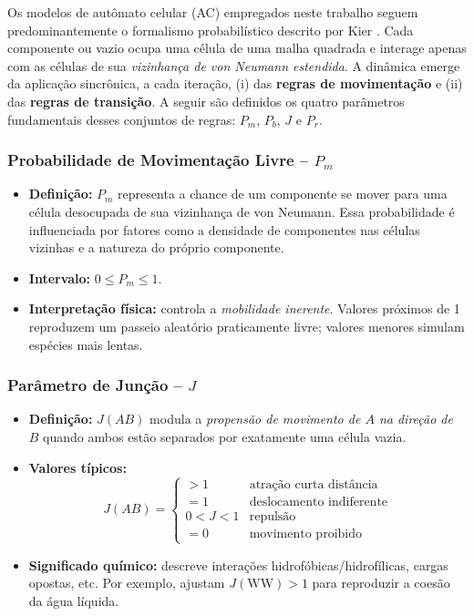\documentclass[12pt,oneside]{report}
\begin{document}
Os modelos de autômato celular (AC) empregados neste trabalho seguem predominantemente o formalismo probabilístico descrito por Kier \cite{kier2005}. Cada componente ou vazio ocupa uma célula de uma malha quadrada e interage apenas com as células de sua \textit{vizinhança de von Neumann estendida}. A dinâmica emerge da aplicação sincrônica, a cada iteração, (i) das \textbf{regras de movimentação} e (ii) das \textbf{regras de transição}. A seguir são definidos os quatro parâmetros fundamentais desses conjuntos de regras: $P_m$, $P_b$, $J$ e $P_r$.

\subsubsection{Probabilidade de Movimentação Livre – \texorpdfstring{$P_m$}{Pm}}
\label{sec:probabilidade_movimento_livre}

\begin{itemize}
    \item \textbf{Definição:} $P_m$ representa a chance de um componente se mover para uma célula desocupada de sua vizinhança de von Neumann. Essa probabilidade é influenciada por fatores como a densidade de componentes nas células vizinhas e a natureza do próprio componente.
    \item \textbf{Intervalo:} $0 \le P_m \le 1$.
    \item \textbf{Interpretação física:} controla a \textit{mobilidade inerente}.
          Valores próximos de 1 reproduzem um passeio aleatório praticamente livre; valores
          menores simulam espécies mais lentas.
\end{itemize}

\subsubsection{Parâmetro de Junção – \texorpdfstring{$J$}{J}}
\label{subsubsec:J}

\begin{itemize}
    \item \textbf{Definição:} $J(AB)$ modula a
          \emph{propensão de movimento de $A$ na direção de $B$}
          quando ambos estão separados por exatamente uma célula vazia.
    \item \textbf{Valores típicos:}
          \[
              J(AB)=
              \begin{cases}
                  >1    & \text{atração curta distância}  \\[2pt]
                  =1    & \text{deslocamento indiferente} \\[2pt]
                  0<J<1 & \text{repulsão}                 \\[2pt]
                  =0    & \text{movimento proibido}
              \end{cases}
          \]
    \item \textbf{Significado químico:} descreve interações
          hidrofóbicas/hidrofílicas, cargas opostas, etc.
          Por exemplo, \citeauthor{kier2005} ajustam
          $J(\mathrm{WW})>1$ para reproduzir a coesão da água líquida.
\end{itemize}
\end{document}
